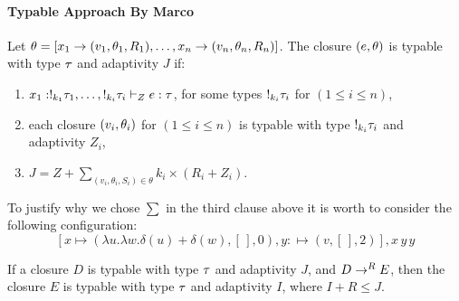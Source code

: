 \paragraph{Typable Approach By Marco}
\begin{defn}
  \label{def:typable}
Let $\theta=[ x_1 \to (v_1 ,  \theta_1 , R_1 ) ,
  \ldots, x_n \to (v_n, \theta_n, R_n )]$. 
  The closure $( e, \theta)$ is typable with
  type $\tau$ and adaptivity $J$ if:
\begin{enumerate}\item  
     $x_1 : !_{k_1} \tau_1, \ldots, !_{k_i} \tau_i 
     \vdash_{Z}  e : \tau$, for some types $!_{k_i}
   \tau_i$ for $(1\leq i\leq n)$, 
\item each closure $(v_i, \theta_i)$ for $(1\leq i\leq n)$ is typable with type
  $!_{k_i} \tau_i$ and adaptivity $Z_i$,
\item $J = Z + \sum_{(v_i,\theta_i,S_i)\in\theta} k_i \times (R_i
  +Z_i)$.
\end{enumerate}
 \end{defn}
To justify why we chose $\sum$ in the third clause above it is worth
to consider the following configuration:
$$
[x\mapsto (\lambda u.\lambda w.\delta(u)+\delta(w),[\,],0)
,y:\mapsto (v,[\,],2) ], x\, y\, y
$$
   
\begin{lem}[Soundness]
  \label{tsound}
  If a closure $D$ is typable with type $\tau$ and adaptivity $J$, and $D \mathrel{\to^{R}} E$, then
    the closure $E$ is typable with type $\tau$ and adaptivity $I$,
    where $I+R\leq J$. 
   \end{lem}
